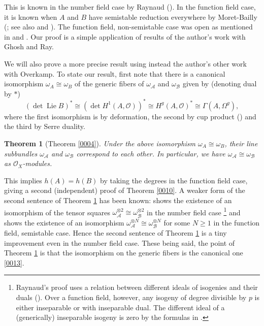 \documentclass{amsart}
\newtheorem{theorem}{Theorem}[section]
\theoremstyle{remark}
\numberwithin{equation}{section}
\newcommand{\Order}{\mathcal{O}}
\newcommand{\tensor}{\mathbin{\otimes}}
\DeclareMathOperator{\Lie}{Lie}
\begin{document}
This is known in the number field case by Raynaud
(\cite[Corollary 2.1.3]{Ray85}).
In the function field case,
it is known when $A$ and $B$ have semistable reduction everywhere
by Moret-Bailly
(\cite[Chapter IX, Lemma 2.4]{MB85};
see also \cite[Remark 2.1.5]{Ray85}
and \cite[Proposition 2.16]{GLFP25}).
The function field, non-semistable case was open
as mentioned in \cite[Remark 2.1.5]{Ray85}
and \cite[Remark 2.17]{GLFP25}.
Our proof is a simple application of results of
the author's work \cite{GRS24} with Ghosh and Ray.

We will also prove a more precise result
using instead the author's other work \cite{OS23} with Overkamp.
To state our result,
first note that there is a canonical isomorphism
$\omega_{A} \cong \omega_{B}$
of the generic fibers of $\omega_{\mathcal{A}}$ and $\omega_{\mathcal{B}}$
given by (denoting dual by $\ast$)
	\begin{equation} \label{0013}
			(\det \Lie B)^{\ast}
		\cong
			(\det H^{1}(A, \Order))^{\ast}
		\cong
			H^{g}(A, \Order)^{\ast}
		\cong
			\Gamma(A, \Omega^{g}),
	\end{equation}
where the first isomorphism is by deformation,
the second by cup product
(\cite[Chapter VII, Section 4.21, Theorem 10]{Ser88})
and the third by Serre duality.

\begin{theorem}[Theorem \ref{0004}] \label{0011}
	Under the above isomorphism $\omega_{A} \cong \omega_{B}$,
	their line subbundles $\omega_{\mathcal{A}}$ and $\omega_{\mathcal{B}}$
	correspond to each other.
	In particular, we have
	$\omega_{\mathcal{A}} \cong \omega_{\mathcal{B}}$
	as $\Order_{X}$-modules.
\end{theorem}

This implies $h(A) = h(B)$ by taking the degrees
in the function field case,
giving a second (independent) proof of Theorem \ref{0010}.
A weaker form of the second sentence of Theorem \ref{0011} has been known:
\cite[Corollary 2.1.3]{Ray85} shows the existence of an isomorphism of the tensor squares
$\omega_{\mathcal{A}}^{\tensor 2} \cong \omega_{\mathcal{B}}^{\tensor 2}$
in the number field case%
\footnote{
	Raynaud's proof uses a relation between
	different ideals of isogenies and their duals
	(\cite[Theorem 2.1.1]{Ray85}).
	Over a function field, however,
	any isogeny of degree divisible by $p$ is either inseparable
	or with inseparable dual.
	The different ideal of a (generically) inseparable isogeny is zero
	by the formulas in \cite[(4.9.5), (4.9.6)]{Ill85}.
}
and \cite[Chapter IX, Lemma 2.4]{MB85} shows the existence of an isomorphism
$\omega_{\mathcal{A}}^{\tensor N} \cong \omega_{\mathcal{B}}^{\tensor N}$
for some $N \ge 1$
in the function field, semistable case.
Hence the second sentence of Theorem \ref{0011} is a tiny improvement
even in the number field case.
These being said,
the point of Theorem \ref{0011} is that
the isomorphism on the generic fibers is the canonical one \eqref{0013}.
\end{document}
